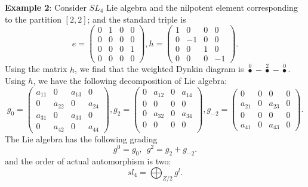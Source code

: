 \documentclass[a4paper,11pt]{article}
\begin{document}
\textbf{Example 2}: Consider $SL_4$ Lie algebra and the nilpotent element corresponding to the partition $[2,2]$; and the standard triple is 
\begin{equation}
e=\left(\begin{array}{cccc}
0&1&0&0\\
0&0 &0&0\\
0&0&0&1 \\
0&0&0&0
\end{array}\right), 
h=\left(\begin{array}{cccc}
1&0&0&0\\
0&-1 &0&0\\
0&0&1&0 \\
0&0&0&-1
\end{array}\right).
\end{equation}
Using the matrix $h$, we find that  the weighted Dynkin diagram is $\overset{0}{\bullet}-\overset{2}{\bullet}-\overset{0}{\bullet}$. Using $h$, we have the following decomposition of Lie algebra: 
\begin{equation}
g_{0}=\left(\begin{array}{cccc}
a_{11}&0&a_{13}&0\\
0&a_{22} & 0&a_{24}\\
a_{31}&0&a_{33}&0 \\
0&a_{42}&0&a_{44}
\end{array}\right),
g_{2}=\left(\begin{array}{cccc}
0&a_{12}&0&a_{14}\\
0&0&0&0 \\
0&a_{32}&0&a_{34} \\
0&0&0&0 \\
\end{array}\right),
g_{-2}=\left(\begin{array}{cccc}
0&0&0&0\\
a_{21}&0 & a_{23}&0\\
0&0&0&0 \\
a_{41}&0&a_{43}&0
\end{array}\right).
\end{equation}
The Lie algebra has the following grading
\begin{equation}
g^0=g_0,~~g^2=g_2+g_{-2}.
\end{equation}
and the order of actual automorphism is two:
\begin{equation}
sl_4=\bigoplus_{Z/2} g^l.
\end{equation}
\end{document}
